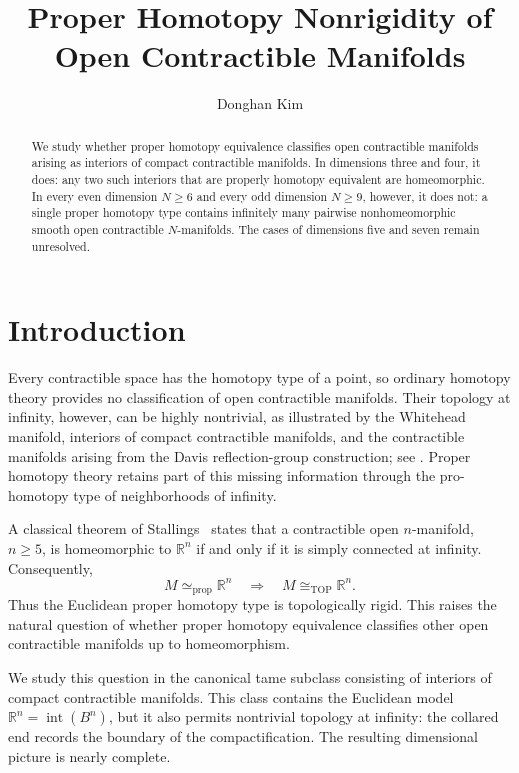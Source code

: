 \documentclass[10pt,reqno]{amsart}
\title{Proper Homotopy Nonrigidity of Open Contractible Manifolds}
\author{Donghan Kim}
\date{}
\numberwithin{equation}{section}
\theoremstyle{definition}
\theoremstyle{remark}
\newcommand{\TOP}{\mathrm{TOP}}
\newcommand{\Int}{\operatorname{int}}
\newcommand{\simeqp}{\simeq_{\mathrm{prop}}}
\begin{document}
\begin{abstract}
We study whether proper homotopy equivalence classifies open contractible manifolds arising as interiors of compact contractible manifolds. In dimensions three and four, it does: any two such interiors that are properly homotopy equivalent are homeomorphic. In every even dimension $N\geq 6$ and every odd dimension $N\geq 9$, however, it does not: a single proper homotopy type contains infinitely many pairwise nonhomeomorphic smooth open contractible $N$-manifolds. The cases of dimensions five and seven remain unresolved.
\end{abstract}

\maketitle

\section{Introduction}

Every contractible space has the homotopy type of a point, so ordinary
homotopy theory provides no classification of open contractible
manifolds.  Their topology at infinity, however, can be highly
nontrivial, as illustrated by the Whitehead manifold, interiors of
compact contractible manifolds, and the contractible manifolds arising
from the Davis reflection-group construction; see
\cite{DavisReflection,GuilbaultEnds}.  Proper homotopy theory retains
part of this missing information through the pro-homotopy type of
neighborhoods of infinity.

A classical theorem of Stallings~\cite{StallingsEuclidean} states that
a contractible open \(n\)-manifold, \(n\geq5\), is homeomorphic to
\(\mathbb R^n\) if and only if it is simply connected at infinity.
Consequently,
\[
M\simeqp\mathbb R^n
\quad\Longrightarrow\quad
M\cong_{\TOP}\mathbb R^n.
\]
Thus the Euclidean proper homotopy type is topologically rigid.  This
raises the natural question of whether proper homotopy equivalence
classifies other open contractible manifolds up to homeomorphism.

We study this question in the canonical tame subclass consisting of
interiors of compact contractible manifolds.  This class contains the
Euclidean model \(\mathbb R^n=\Int(B^n)\), but it also permits
nontrivial topology at infinity: the collared end records the boundary
of the compactification.  The resulting dimensional picture is nearly
complete.
\end{document}
